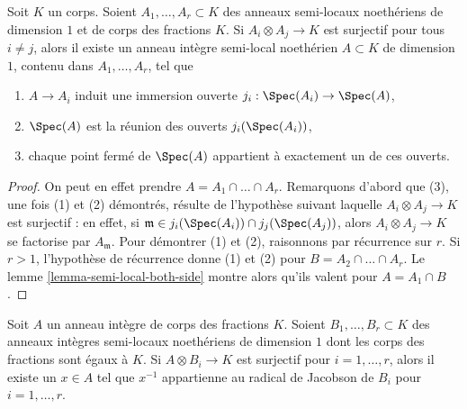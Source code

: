 \begin{lemma}
\label{lemma-glue-a-bunch-of-local-rings}
Soit $K$ un corps. Soient $A_1, \ldots, A_r \subset K$ des anneaux
semi-locaux noethériens de dimension $1$ et de corps des fractions $K$. Si
$A_i \otimes A_j \to K$ est surjectif pour tous $i \not = j$, alors
il existe un anneau intègre semi-local noethérien $A \subset K$
de dimension $1$, contenu dans $A_1, \ldots, A_r$, tel que
\begin{enumerate}
\item $A \to A_i$ induit une immersion ouverte $j_i : \Spec(A_i) \to \Spec(A)$,
\item $\Spec(A)$ est la réunion des ouverts $j_i(\Spec(A_i))$,
\item chaque point fermé de $\Spec(A)$ appartient à exactement un de ces
ouverts.
\end{enumerate}
\end{lemma}

\begin{proof}
On peut en effet prendre $A = A_1 \cap \ldots \cap A_r$. Remarquons d'abord que (3),
une fois (1) et (2) démontrés, résulte de l'hypothèse suivant laquelle
$A_i \otimes A_j \to K$ est surjectif : en effet, si
$\mathfrak m \in j_i(\Spec(A_i)) \cap j_j(\Spec(A_j))$, alors
$A_i \otimes A_j \to K$ se factorise par $A_\mathfrak m$.
Pour démontrer (1) et (2), raisonnons par récurrence sur $r$.
Si $r > 1$, l'hypothèse de récurrence donne (1) et (2) pour
$B = A_2 \cap \ldots \cap A_r$. Le
lemme \ref{lemma-semi-local-both-side} montre alors qu'ils valent pour
$A = A_1 \cap B$.
\end{proof}

\begin{lemma}
\label{lemma-create-globally-generated}
Soit $A$ un anneau intègre de corps des fractions $K$. Soient $B_1, \ldots, B_r \subset K$
des anneaux intègres semi-locaux noethériens de dimension $1$ dont les corps des
fractions sont égaux à $K$. Si $A \otimes B_i \to K$ est surjectif pour $i = 1, \ldots, r$,
alors il existe un $x \in A$ tel que $x^{-1}$ appartienne au radical de Jacobson de
$B_i$ pour $i = 1, \ldots, r$.
\end{lemma}

